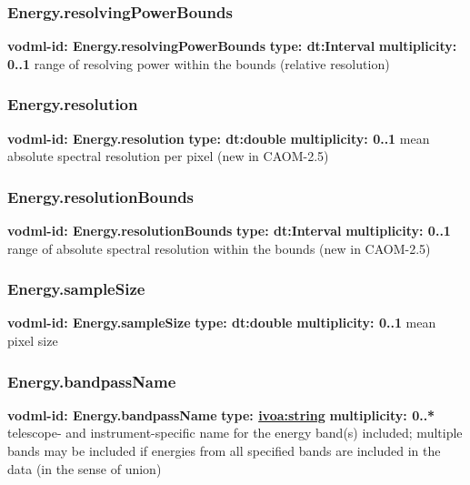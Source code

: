    \subsubsection{Energy.resolvingPowerBounds}
      \textbf{vodml-id: Energy.resolvingPowerBounds} \newline
      \textbf{type: dt:Interval} \newline
      \textbf{multiplicity: 0..1} \newline
      range of resolving power within the bounds (relative resolution)

    \subsubsection{Energy.resolution}
      \textbf{vodml-id: Energy.resolution} \newline
      \textbf{type: dt:double} \newline
      \textbf{multiplicity: 0..1} \newline
      mean absolute spectral resolution per pixel (new in CAOM-2.5)

    \subsubsection{Energy.resolutionBounds}
      \textbf{vodml-id: Energy.resolutionBounds} \newline
      \textbf{type: dt:Interval} \newline
      \textbf{multiplicity: 0..1} \newline
      range of absolute spectral resolution within the bounds (new in CAOM-2.5)

    \subsubsection{Energy.sampleSize}
      \textbf{vodml-id: Energy.sampleSize} \newline
      \textbf{type: dt:double} \newline
      \textbf{multiplicity: 0..1} \newline
      mean pixel size

    \subsubsection{Energy.bandpassName}
      \textbf{vodml-id: Energy.bandpassName} \newline
      \textbf{type: \hyperref[sect:ivoa]{ivoa:string}} \newline
      \textbf{multiplicity: 0..*} \newline
      telescope- and instrument-specific name for the energy band(s) included; multiple bands may be included if energies from all specified bands are included in the data (in the sense of union)

